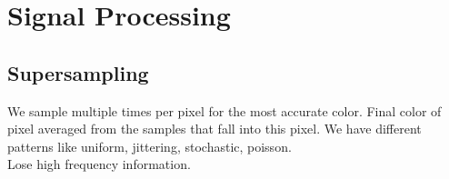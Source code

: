 \section{Signal Processing}
\subsection*{Supersampling}
We sample multiple times per pixel for the most accurate color. Final color of pixel averaged from the samples that fall into this pixel. 
We have different patterns like uniform, jittering, stochastic, poisson.\\
Lose high frequency information.
